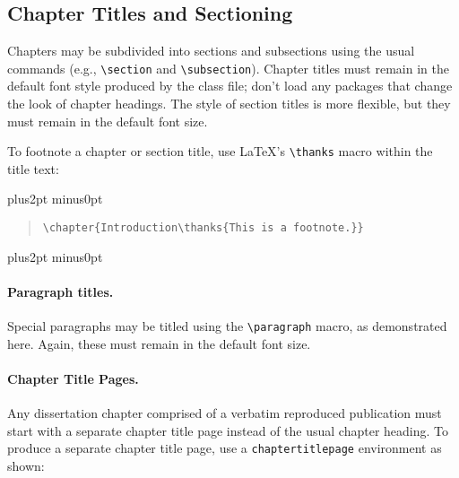 \documentclass[doublespacing]{utdthesis}
\newenvironment{exampleclasscode}
 {\parindent=1cm\vskip0pt plus2pt minus0pt\begin{verse}}
 {\end{verse}\vskip0pt plus2pt minus0pt}
\begin{document}
\subsection{Chapter Titles and Sectioning}
\label{s:sect}

Chapters may be subdivided into sections and subsections using the
usual commands (e.g., \verb|\section| and \verb|\subsection|).
Chapter titles must remain in the default font style produced by the
class file; don't load any packages that change the look of chapter headings.
The style of section titles is more flexible, but they must remain in the
default font size.

To footnote a chapter or section title, use \LaTeX's
\verb|\thanks| macro within the title text:

\begin{exampleclasscode}
\verb|\chapter{Introduction\thanks{This is a footnote.}}|
\end{exampleclasscode}

\paragraph{Paragraph titles.}
Special paragraphs may be titled using the \verb|\paragraph| macro, as
demonstrated here.
Again, these must remain in the default font size.

\paragraph{Chapter Title Pages.}
\label{s:ctp}

Any dissertation chapter comprised of a verbatim reproduced publication
must start with a separate chapter title page instead of the usual chapter
heading.
To produce a separate chapter title page, use a \verb|chaptertitlepage|
environment as shown:
\end{document}
